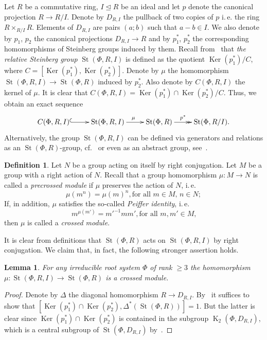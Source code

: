 \documentclass[oneside, 10pt]{amsart}
\DeclareMathOperator{\St}{St}
\DeclareMathOperator{\K}{K}
\DeclareMathOperator{\Ker}{Ker}
\numberwithin{equation}{section}
\numberwithin{thm}{section}
\newtheorem{lemma}[thm]{Lemma}
\numberwithin{lemma}{section}
\theoremstyle{definition}
\newtheorem{dfn}[lemma]{Definition}
\theoremstyle{remark}
\begin{document}
Let $R$ be a commutative ring, $I \trianglelefteq R$ be an ideal and let $p$ denote the canonical projection $R \to R/I$.
Denote by $D_{R, I}$ the pullback of two copies of $p$ i.\,e. the ring $R \times_{R/I} R$.
Elements of $D_{R, I}$ are pairs $(a; b)$ such that $a-b \in I$.
We also denote by $p_1$, $p_2$ the canonical projections $D_{R, I} \to R$ and by $p_1^*$, $p_2^*$ the corresponding homomorphisms of Steinberg groups induced by them.
Recall from~\cite[Definition~2.5]{LS20} that \textit{the relative Steinberg group} $\St(\Phi, R, I)$ is defined as the quotient
$\Ker(p_1^*) / C$, where $C = [\Ker(p_1^*), \Ker(p_2^*)]$.
Denote by $\mu$ the homomorphism $\St(\Phi, R, I) \to \St(\Phi, R)$ induced by $p_2^*$.
Also denote by $C(\Phi, R, I)$ the kernel of $\mu$.
It is clear that $C(\Phi, R, I) = \Ker(p_1^*) \cap \Ker(p_2^*) / C$.
Thus, we obtain an exact sequence
\begin{equation}
\xymatrix{C(\Phi, R, I) \ar@{^{(}->}[r] & \St(\Phi, R, I) \ar[r]^\mu & \St(\Phi, R) \ar@{->>}[r]^-{p^*} & \St(\Phi, R/I). }\label{eq:relative-Steinberg}
\end{equation}
Alternatively, the group $\St(\Phi, R, I)$ can be defined via generators and relations as an $\St(\Phi, R)$-group, cf.~\cite[Proposition~6]{S15}
or even as an abstract group, see~\cite{V22}.

\begin{dfn}\label{dfn:crossed-module}
Let $N$ be a group acting on itself by right conjugation.
Let $M$ be a group with a right action of $N$.
Recall that a group homomorphism $\mu\colon M \to N$ is called a \textit{precrossed module} if $\mu$ preserves the action of $N$, i.\,e.
\[\mu(m^n) = \mu(m)^n, \text{for all $m \in M$, $n\in N;$} \]
If, in addition, $\mu$ satisfies the so-called \textit{Peiffer identity}, i.\,e.
\begin{equation}\label{eq:peiffer} {m}^{\mu(m')} = {m'}^{-1} m m', \text{for all $m, m' \in M$,}\end{equation}
then $\mu$ is called a \textit{crossed module}.
\end{dfn}

It is clear from definitions that $\St(\Phi, R)$ acts on $\St(\Phi, R, I)$ by right conjugation.
We claim that, in fact, the following stronger assertion holds.
\begin{lemma} \label{lem:rel-Steinberg-crossed-module}
For any irreducible root system $\Phi$ of rank $\geq 3$ the homomorphism $\mu \colon \St(\Phi, R, I) \to \St(\Phi, R)$ is a crossed module.
\end{lemma}
\begin{proof}
Denote by $\Delta$ the diagonal homomorphism $R \to D_{R, I}.$
By~\cite[Proposition~6]{Lo78} it suffices to show that $[\Ker(p_1^*) \cap \Ker(p_2^*), \Delta^*(\St(\Phi, R))] = 1$.
But the latter is clear since $\Ker(p_1^*) \cap \Ker(p_2^*)$ is contained in the subgroup $\K_2(\Phi, D_{R, I})$,
which is a central subgroup of $\St(\Phi, D_{R, I})$ by~\cite{LSV1}.
\end{proof}
\end{document}
